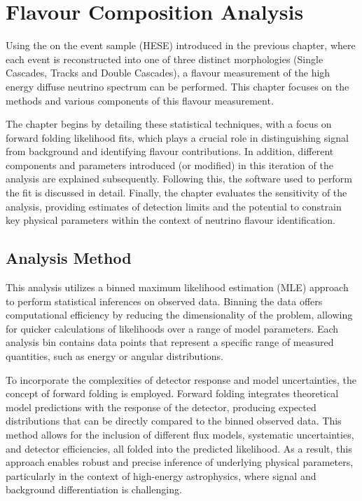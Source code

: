 \setchapterpreamble[u]{\margintoc}
\chapter{Flavour Composition Analysis}
Using the on the event sample (HESE) introduced in the previous chapter, where each event is reconstructed into one of three distinct morphologies (Single Cascades, Tracks and Double Cascades), a flavour measurement of the high energy diffuse neutrino spectrum can be performed. This chapter focuses on the methods and various components of this flavour measurement. 

The chapter begins by detailing these statistical techniques, with a focus on forward folding likelihood fits, which plays a crucial role in distinguishing signal from background and identifying flavour contributions. In addition, different components and parameters introduced (or modified) in this iteration of the analysis are explained subsequently. Following this, the software used to perform the fit is discussed in detail. Finally, the chapter evaluates the sensitivity of the analysis, providing estimates of detection limits and the potential to constrain key physical parameters within the context of neutrino flavour identification.

\section{Analysis Method}
\label{sec:analysis}
This analysis utilizes a binned maximum likelihood estimation (MLE) approach to perform statistical inferences on observed data. Binning the data offers computational efficiency by reducing the dimensionality of the problem, allowing for quicker calculations of likelihoods over a range of model parameters. Each analysis bin contains data points that represent a specific range of measured quantities, such as energy or angular distributions.

To incorporate the complexities of detector response and model uncertainties, the concept of forward folding is employed. Forward folding integrates theoretical model predictions with the response of the detector, producing expected distributions that can be directly compared to the binned observed data. This method allows for the inclusion of different flux models, systematic uncertainties, and detector efficiencies, all folded into the predicted likelihood. As a result, this approach enables robust and precise inference of underlying physical parameters, particularly in the context of high-energy astrophysics, where signal and background differentiation is challenging.

